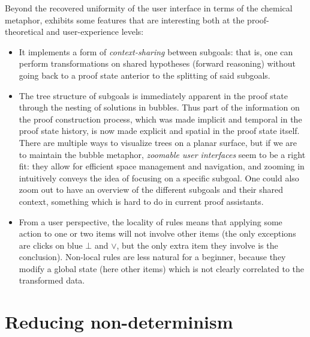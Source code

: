 Beyond the recovered uniformity of the user interface in terms of the chemical
metaphor,  exhibits some features that are interesting both at the
proof-theoretical and user-experience levels:
\begin{itemize}
  \item It implements a form of \emph{context-sharing} between subgoals: that
    is, one can perform transformations on shared hypotheses (forward reasoning)
    without going back to a proof state anterior to the splitting of said
    subgoals.
  \item The tree structure of subgoals is immediately apparent in the proof
    state through the nesting of solutions in bubbles. Thus part of the
    information on the proof construction process, which was made implicit and
    temporal in the proof state history, is now made explicit and spatial in the
    proof state itself. There are multiple ways to visualize trees on a planar
    surface, but if we are to maintain the bubble metaphor, \emph{zoomable user
    interfaces} seem to be a right fit: they allow for efficient space
    management and navigation, and zooming in intuitively conveys the idea of
    focusing on a specific subgoal. One could also zoom out to have an overview
    of the different subgoals and their shared context, something which is hard
    to do in current proof assistants.
  \item From a user perspective, the locality of rules means that applying some
    action to one or two items will not involve other items (the only exceptions
    are clicks on blue $\bot$ and $\lor$, but the only extra item they involve
    is the conclusion). Non-local rules are less natural for a beginner, because
    they modify a global state (here other items) which is not clearly
    correlated to the transformed data.
\end{itemize}

\section{Reducing non-determinism}

